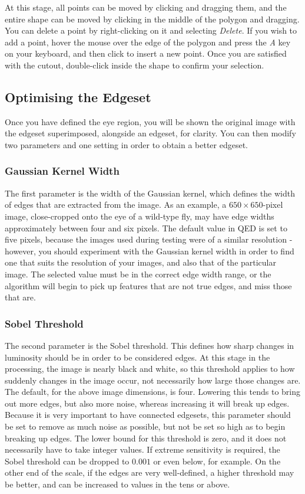 \documentclass[a4paper,11pt]{article}
\begin{document}
At this stage, all points can be moved by clicking and dragging them, and the entire shape can be moved by clicking in the middle of the polygon and dragging. You can delete a point by right-clicking on it and selecting \textit{Delete}. If you wish to add a point, hover the mouse over the edge of the polygon and press the \textit{A} key on your keyboard, and then click to insert a new point. Once you are satisfied with the cutout, double-click inside the shape to confirm your selection.



\subsection{Optimising the Edgeset}
Once you have defined the eye region, you will be shown the original image with the edgeset superimposed, alongside an edgeset, for clarity. You can then modify two parameters and one setting in order to obtain a better edgeset. 

\subsubsection*{Gaussian Kernel Width}

The first parameter is the width of the Gaussian kernel, which defines the width of edges that are extracted from the image. As an example, a $650\times650$-pixel image, close-cropped onto the eye of a wild-type fly, may have edge widths approximately between four and six pixels. The default value in QED is set to five pixels, because the images used during testing were of a similar resolution - however, you should experiment with the Gaussian kernel width in order to find one that suits the resolution of your images, and also that of the particular image. The selected value must be in the correct edge width range, or the algorithm will begin to pick up features that are not true edges, and miss those that are.

\subsubsection*{Sobel Threshold}

The second parameter is the Sobel threshold. This defines how sharp changes in luminosity should be in order to be considered edges. At this stage in the processing, the image is nearly black and white, so this threshold applies to how suddenly changes in the image occur, not necessarily how large those changes are. The default, for the above image dimensions, is four. Lowering this tends to bring out more edges, but also more noise, whereas increasing it will break up edges. Because it is very important to have connected edgesets, this parameter should be set to remove as much noise as possible, but not be set so high as to begin breaking up edges. The lower bound for this threshold is zero, and it does not necessarily have to take integer values. If extreme sensitivity is required, the Sobel threshold can be dropped to $0.001$ or even below, for example. On the other end of the scale, if the edges are very well-defined, a higher threshold may be better, and can be increased to values in the tens or above.
\end{document}
